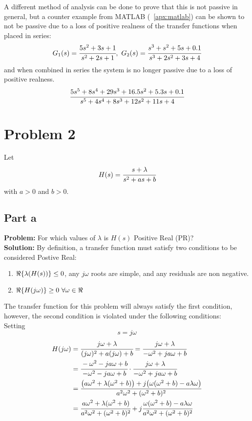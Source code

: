 \documentclass[letter]{article}
\begin{document}
A different method of analysis can be done to prove that this is not passive in general, but a counter example from MATLAB (\appendixname \ \ref{apx:matlab}) can be shown to not be passive due to a loss of positive realness of the transfer functions when placed in series:
$$G_1(s) = \cfrac{5s^2 + 3s + 1}{s^2 + 2s + 1}, \ G_2(s) = \cfrac{s^3 + s^2 + 5s + 0.1}{s^3 + 2s^2 + 3s + 4}$$
and when combined in series the system is no longer passive due to a loss of positive realness.
$$ \cfrac{5 s^5 + 8 s^4 + 29 s^3 + 16.5 s^2 + 5.3 s + 0.1}{s^5 + 4 s^4 + 8 s^3 + 12 s^2 + 11 s + 4}$$

\newpage
\section{Problem 2}
Let $$H(s) = \cfrac{s+\lambda}{s^2 + a s + b}$$ with $a>0$ and $b>0$.

\subsection{Part a}
\textbf{Problem:}
For which values of $\lambda$ is $H(s)$ Positive Real (PR)?\\

\noindent
\textbf{Solution:}
By definition, a transfer function must satisfy two conditions to be considered Postive Real:
\begin{enumerate}
	\item $\real\{\lambda(H(s))\} \leq 0$, any $j\omega$ roots are simple, and any residuals are non negative.
	\item $\real\{H(j\omega)\} \geq 0 \ \forall \omega \in \real$
\end{enumerate}

The transfer function for this problem will always satisfy the first condition, however, the second condition is violated under the following conditions:\\

Setting $$s = j\omega$$
\begin{align}
	H(j\omega) &= \cfrac{j\omega + \lambda}{(j\omega)^2 + a (j\omega) + b}
	= \cfrac{j\omega + \lambda}{-\omega^2 + j a \omega + b}\\
	&= \cfrac{-\omega^2 - j a \omega + b}{-\omega^2 - j a \omega + b} \cdot \cfrac{j\omega + \lambda}{-\omega^2 + j a \omega + b}\\
	&= \cfrac{\qty(a \omega^2 + \lambda (\omega^2 + b)) + j \qty(\omega (\omega^2 + b) - a \lambda \omega)}{a^2 \omega^2 + (\omega^2 + b)^2}\\
	&= \cfrac{a \omega^2 + \lambda (\omega^2 + b)}{a^2 \omega^2 + (\omega^2 + b)^2} + j \cfrac{\omega (\omega^2 + b) - a \lambda \omega}{a^2 \omega^2 + (\omega^2 + b)^2}
\end{align}
\end{document}
